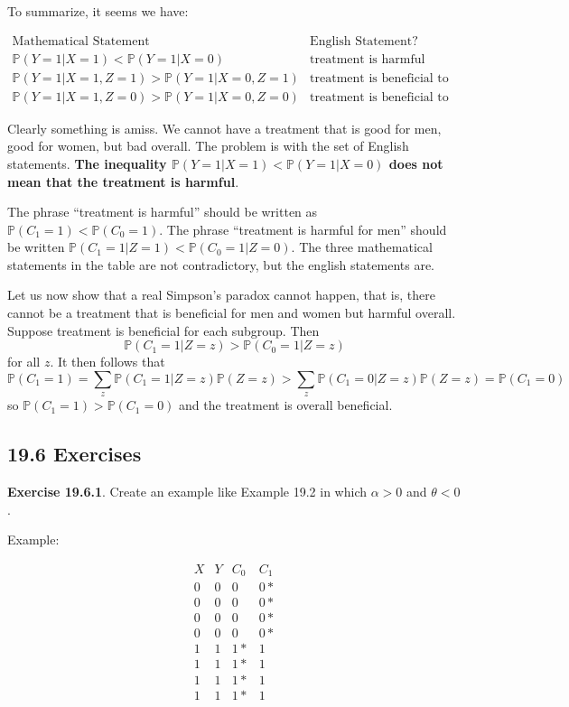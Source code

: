 To summarize, it seems we have:

\[
\begin{array}{ll}
\text{Mathematical Statement} & \text{English Statement?} \\
\hline
\mathbb{P}(Y = 1 | X = 1) < \mathbb{P}(Y = 1 | X = 0) & \text{treatment is harmful} \\
\mathbb{P}(Y = 1 | X = 1, Z = 1) > \mathbb{P}(Y = 1 | X = 0, Z = 1) & \text{treatment is beneficial to men} \\
\mathbb{P}(Y = 1 | X = 1, Z = 0) > \mathbb{P}(Y = 1 | X = 0, Z = 0) & \text{treatment is beneficial to women}
\end{array}
\]

Clearly something is amiss. We cannot have a treatment that is good for men, good for women, but bad overall. The problem is with the set of English statements. \textbf{The inequality \(\mathbb{P}(Y = 1 | X = 1) < \mathbb{P}(Y = 1 | X = 0)\) does not mean that the treatment is harmful}.

The phrase ``treatment is harmful'' should be written as \(\mathbb{P}(C_{1} = 1) < \mathbb{P}(C_{0} = 1)\). The phrase ``treatment is harmful for men'' should be written \(\mathbb{P}(C_{1} = 1 | Z = 1) < \mathbb{P}(C_{0} = 1 | Z = 0)\). The three mathematical statements in the table are not contradictory, but the english statements are.

Let us now show that a real Simpson's paradox cannot happen, that is, there cannot be a treatment that is beneficial for men and women but harmful overall. Suppose treatment is beneficial for each subgroup. Then
\[
\mathbb{P}(C_{1} = 1 | Z = z) > \mathbb{P}(C_{0} = 1 | Z = z)
\]
for all \(z\). It then follows that
\[
\mathbb{P}(C_{1} = 1) = \sum_z \mathbb{P}(C_{1} = 1 | Z = z) \mathbb{P}(Z = z) > \sum_z \mathbb{P}(C_{1} = 0 | Z = z) \mathbb{P}(Z = z) = \mathbb{P}(C_{1} = 0)
\]
so \(\mathbb{P}(C_{1} = 1) > \mathbb{P}(C_{1} = 0)\) and the treatment is
overall beneficial.

\subsection*{19.6 Exercises}

\textbf{Exercise 19.6.1}. Create an example like Example 19.2 in which \(\alpha > 0\) and \(\theta < 0\).

Example:

\[
\begin{array}{cccc}
X & Y & C_{0} & C_{1} \\
\hline
0 & 0 & 0 & 0* \\
0 & 0 & 0 & 0* \\
0 & 0 & 0 & 0* \\
0 & 0 & 0 & 0* \\
\hline
1 & 1 & 1* & 1 \\
1 & 1 & 1* & 1 \\
1 & 1 & 1* & 1 \\
1 & 1 & 1* & 1
\end{array}
\]

